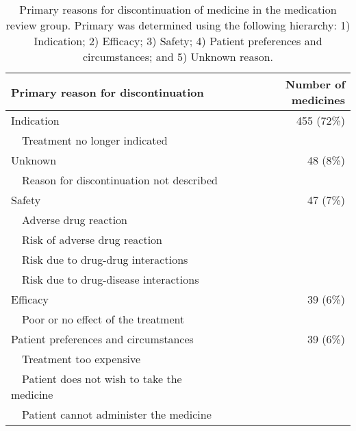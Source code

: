 \begin{table}[]
\label{tbl:ta}
\caption{Primary reasons for discontinuation of medicine in the medication review group. Primary was determined using the following hierarchy: 1) Indication; 2) Efficacy; 3) Safety; 4) Patient preferences and circumstances; and 5) Unknown reason.}
\begin{tabular}{l@{}r}
\toprule
\textbf{Primary reason for discontinuation} & \textbf{Number of medicines} \\ \midrule
Indication                                  & 455 (72\%)                                       \\
~~Treatment no longer indicated               &                                                  \\
Unknown                                     & 48 (8\%)                                         \\
~~Reason for discontinuation not described    &                                                  \\
Safety                                      & 47 (7\%)                                         \\
~~Adverse drug reaction                       &                                                  \\
~~Risk of adverse drug reaction               &                                                  \\
~~Risk due to drug-drug interactions          &                                                  \\
~~Risk due to drug-disease interactions       &                                                  \\
Efficacy                                    & 39 (6\%)                                         \\
~~Poor or no effect of the treatment          &                                                  \\
Patient preferences and circumstances       & 39 (6\%)                                         \\
~~Treatment too expensive                     &                                                  \\
~~Patient does not wish to take the medicine  &                                                  \\
~~Patient cannot administer the medicine      &                                                  \\ \bottomrule
\end{tabular}
\end{table}